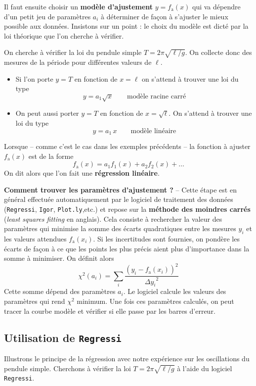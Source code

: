 Il faut ensuite choisir un \textbf{modèle d'ajustement} $y=f_\text{a}(x)$ qui va dépendre d'un petit jeu de paramètres $a_i$ à déterminer de façon à s'ajuster le mieux possible aux données. Insistons sur un point : le choix du modèle est dicté par la loi théorique que l'on cherche à vérifier. 

\begin{kaoexample}[frametitle=Exemple]
On cherche à vérifier la loi du pendule simple $T=2\pi\sqrt{\ell/g}$. On collecte donc des mesures de la période pour différentes valeurs de $\ell$.
\begin{itemize}
	\item Si l'on porte $y=T$ en fonction de $x=\ell$ on s'attend à trouver une loi du type 
	\[	y=a_1\sqrt{x}\qquad\text{modèle racine carré}\] 
	
	\item On peut aussi porter $y=T$ en fonction de $x=\sqrt{\ell}$. On s'attend à trouver une loi du type 
	\[	y=a_1\,x \qquad\text{modèle linéaire}\]
\end{itemize}
\end{kaoexample} 
Lorsque -- comme c'est le cas dans les exemples précédents -- la fonction à ajuster $f_\text{a}(x)$ est de la forme 
\[
	f_\text{a}(x)=a_1f_1(x)+a_2f_2(x)+\ldots
\]  
On dit alors que l'on fait une \textbf{régression linéaire}.

\textbf{Comment trouver les paramètres d'ajustement ?} -- Cette étape est en général effectuée automatiquement par le logiciel de traitement des données (\texttt{Regressi}, \texttt{Igor}, \texttt{Plot.ly},etc.) et repose sur la \textbf{méthode des moindres carrés} (\emph{least squares fitting} en anglais). Cela consiste à rechercher la valeur des paramètres qui minimise la somme des écarts quadratiques entre les mesures $y_i$ et les valeurs attendues $f_\text{a}(x_i)$. Si les incertitudes sont fournies, on pondère les écarts de façon à ce que les points les plus précis aient plus d'importance dans la somme à minimiser. On définit alors 
\[
	\chi^2(a_i)=\sum_i \frac{(y_i-f_\text{a}(x_i))^2}{{\Delta y_i}^2}
\]
Cette somme dépend des paramètres $a_i$. Le logiciel calcule les valeurs des paramètres qui rend $\chi^2$ minimum. Une fois ces paramètres calculés, on peut tracer la courbe modèle et vérifier si elle passe par les barres d'erreur.


\subsection{Utilisation de \texttt{Regressi}}
Illustrons le principe de la régression avec notre expérience sur les oscillations du pendule simple. Cherchons à vérifier la loi $T=2\pi\sqrt{\ell/g}$ à l'aide du logiciel \texttt{Regressi}.

